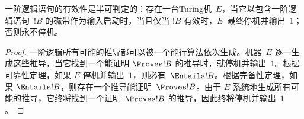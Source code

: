 \documentclass[../../../include/open-logic-section]{subfiles}
\begin{document}
\begin{thm}
  一阶逻辑语句的有效性是半可判定的：存在一台Turing机~$E$，当它以包含一阶逻辑语句~$!B$ 的磁带作为输入启动时，当且仅当 $!B$ 有效时，$E$~最终停机并输出~$1$；否则永不停机。
\end{thm}

\begin{proof}
  一阶逻辑所有可能的推导都可以被一个能行算法依次生成。机器~$E$ 逐一生成这些推导，当它找到一个能证明 $\Proves !B$ 的推导时，就停机并输出~$1$。根据可靠性定理，如果 $E$ 停机并输出~$1$，则必有~$\Entails !B$。根据完备性定理，如果 $\Entails !B$，则存在一个推导能证明~$\Proves !B$。由于 $E$ 系统地生成所有可能的推导，它终将找到一个证明~$\Proves !B$ 的推导，因此终将停机并输出~$1$。
\end{proof}
\end{document}
